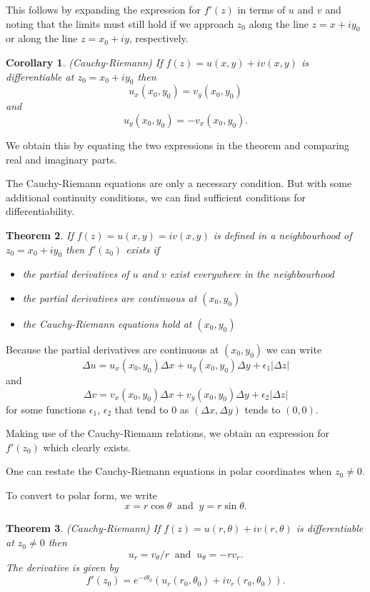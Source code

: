 \documentclass[a4paper,10pt]{article}
\newtheorem{theorem}{Theorem}[section]
\newtheorem{corollary}[theorem]{Corollary}
\begin{document}
This follows by expanding the expression for $f'(z)$ in terms of $u$ and $v$ and noting that the limits must still hold if we approach $z_0$ along the line $z = x + iy_0$ or along the line $z = x_0 + iy$, respectively.

\begin{corollary} (Cauchy-Riemann)
If $f(z) = u(x, y) + iv(x, y)$ is differentiable at $z_0 = x_0 + iy_0$ then
$$u_x(x_0, y_0) = v_y(x_0, y_0)$$
and
$$u_y(x_0, y_0) = -v_x(x_0, y_0).$$
\end{corollary}

We obtain this by equating the two expressions in the theorem and comparing real and imaginary parts.

The Cauchy-Riemann equations are only a necessary condition. But with some additional continuity conditions, we can find sufficient conditions for differentiability.

\begin{theorem}
If $f(z) = u(x, y) = iv(x, y)$ is defined in a neighbourhood of $z_0 = x_0 + iy_0$ then $f'(z_0)$ exists if 
\begin{itemize}
\item the partial derivatives of $u$ and $v$ exist everywhere in the neighbourhood
\item the partial derivatives are continuous at $(x_0, y_0)$
\item the Cauchy-Riemann equations hold at $(x_0, y_0)$
\end{itemize}
\end{theorem}

Because the partial derivatives are continuous at $(x_0, y_0)$ we can write
$$\Delta u = u_x(x_0, y_0)\Delta x + u_y(x_0, y_0)\Delta y + \epsilon_1 |\Delta z|$$
and
$$\Delta v = v_x(x_0, y_0)\Delta x + v_y(x_0, y_0)\Delta y + \epsilon_2 |\Delta z|$$
for some functions $\epsilon_1$, $\epsilon_2$ that tend to $0$ as $(\Delta x, \Delta y)$ tends to $(0, 0)$.

Making use of the Cauchy-Riemann relations, we obtain an expression for $f'(z_0)$ which clearly exists.

One can restate the Cauchy-Riemann equations in polar coordinates when $z_0 \neq 0$.

To convert to polar form, we write
$$x = r\cos\theta \;\;\mbox{and}\;\; y = r\sin\theta.$$

\begin{theorem} (Cauchy-Riemann)
If $f(z) = u(r, \theta) + iv(r, \theta)$ is differentiable at $z_0 \neq 0$ then
$$u_r = v_\theta/r \;\;\mbox{and}\;\; u_\theta = -rv_r.$$
The derivative is given by
$$f'(z_0) = e^{-i\theta_0}\left(u_r(r_0, \theta_0) + iv_r(r_0, \theta_0)\right).$$
\end{theorem}
\end{document}
